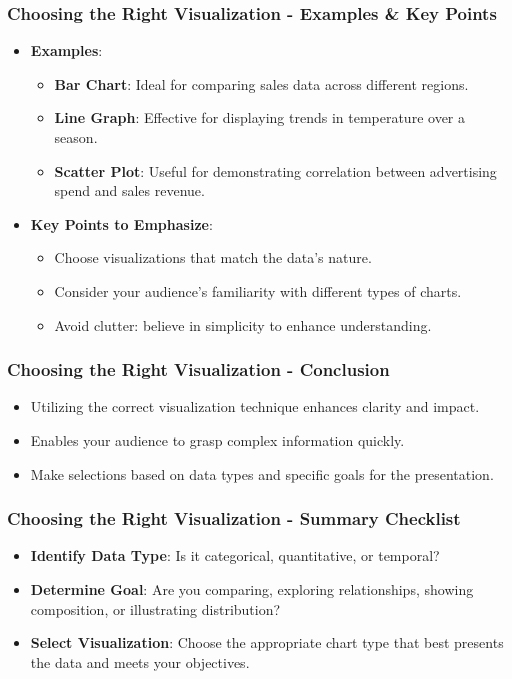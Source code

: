 \documentclass[aspectratio=169]{beamer}
\begin{document}
\begin{frame}[fragile]
    \frametitle{Choosing the Right Visualization - Examples & Key Points}
    \begin{itemize}
        \item \textbf{Examples}:
            \begin{itemize}
                \item \textbf{Bar Chart}: Ideal for comparing sales data across different regions.
                \item \textbf{Line Graph}: Effective for displaying trends in temperature over a season.
                \item \textbf{Scatter Plot}: Useful for demonstrating correlation between advertising spend and sales revenue.
            \end{itemize}
        \item \textbf{Key Points to Emphasize}:
            \begin{itemize}
                \item Choose visualizations that match the data’s nature.
                \item Consider your audience's familiarity with different types of charts.
                \item Avoid clutter: believe in simplicity to enhance understanding.
            \end{itemize}
    \end{itemize}
\end{frame}

\begin{frame}[fragile]
    \frametitle{Choosing the Right Visualization - Conclusion}
    \begin{itemize}
        \item Utilizing the correct visualization technique enhances clarity and impact.
        \item Enables your audience to grasp complex information quickly.
        \item Make selections based on data types and specific goals for the presentation.
    \end{itemize}
\end{frame}

\begin{frame}[fragile]
    \frametitle{Choosing the Right Visualization - Summary Checklist}
    \begin{itemize}
        \item [ ] \textbf{Identify Data Type}: Is it categorical, quantitative, or temporal?
        \item [ ] \textbf{Determine Goal}: Are you comparing, exploring relationships, showing composition, or illustrating distribution?
        \item [ ] \textbf{Select Visualization}: Choose the appropriate chart type that best presents the data and meets your objectives.
    \end{itemize}
\end{frame}
\end{document}
